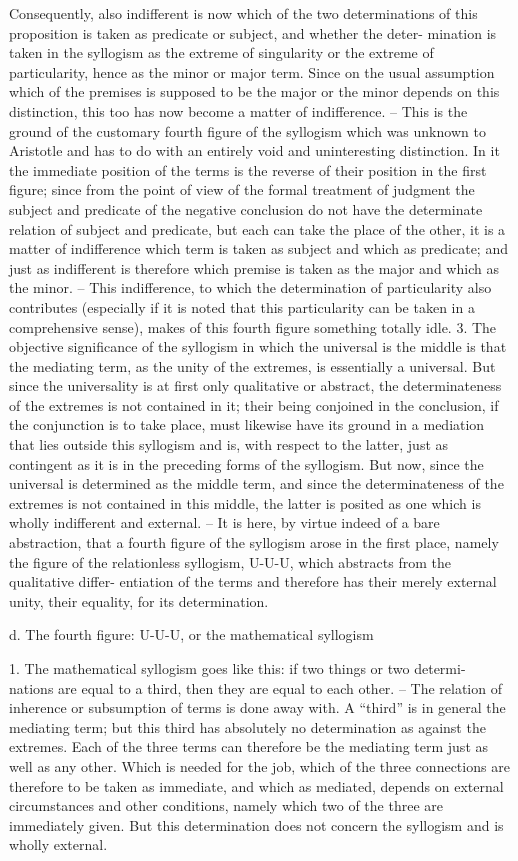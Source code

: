 Consequently, also indifferent is now which of the two determinations
of this proposition is taken as predicate or subject, and whether the deter-
mination is taken in the syllogism as the extreme of singularity or the
extreme of particularity, hence as the minor or major term. Since on the
usual assumption which of the premises is supposed to be the major or
the minor depends on this distinction, this too has now become a matter
of indifference. – This is the ground of the customary fourth figure of the
syllogism which was unknown to Aristotle and has to do with an entirely
void and uninteresting distinction. In it the immediate position of the
terms is the reverse of their position in the first figure; since from the point
of view of the formal treatment of judgment the subject and predicate of
the negative conclusion do not have the determinate relation of subject
and predicate, but each can take the place of the other, it is a matter of
indifference which term is taken as subject and which as predicate; and just
as indifferent is therefore which premise is taken as the major and which as
the minor. – This indifference, to which the determination of particularity
also contributes (especially if it is noted that this particularity can be taken
in a comprehensive sense), makes of this fourth figure something totally idle.
3. The objective significance of the syllogism in which the universal is
the middle is that the mediating term, as the unity of the extremes, is
essentially a universal. But since the universality is at first only qualitative or
abstract, the determinateness of the extremes is not contained in it; their
being conjoined in the conclusion, if the conjunction is to take place, must
likewise have its ground in a mediation that lies outside this syllogism and
is, with respect to the latter, just as contingent as it is in the preceding forms
of the syllogism. But now, since the universal is determined as the middle
term, and since the determinateness of the extremes is not contained in
this middle, the latter is posited as one which is wholly indifferent and
external. – It is here, by virtue indeed of a bare abstraction, that a fourth
figure of the syllogism arose in the first place, namely the figure of the
relationless syllogism, U-U-U, which abstracts from the qualitative differ-
entiation of the terms and therefore has their merely external unity, their
equality, for its determination.

d. The fourth figure: U-U-U, or the mathematical syllogism

1. The mathematical syllogism goes like this: if two things or two determi-
nations are equal to a third, then they are equal to each other. – The relation
of inherence or subsumption of terms is done away with.
A “third” is in general the mediating term; but this third has absolutely
no determination as against the extremes. Each of the three terms can
therefore be the mediating term just as well as any other. Which is needed
for the job, which of the three connections are therefore to be taken as
immediate, and which as mediated, depends on external circumstances
and other conditions, namely which two of the three are immediately
given. But this determination does not concern the syllogism and is wholly
external.

